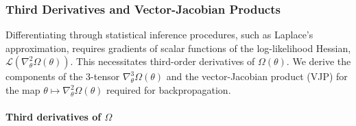 \documentclass{article}
\begin{document}
\subsubsection{Third Derivatives and Vector-Jacobian Products}

Differentiating through statistical inference procedures, such as Laplace's approximation, requires gradients of scalar functions of the log-likelihood Hessian, $\mathcal{L}(\nabla_\theta^2 \Omega(\theta))$.
This necessitates third-order derivatives of $\Omega(\theta)$.
We derive the components of the 3-tensor $\nabla_\theta^3 \Omega(\theta)$ and the vector-Jacobian product (VJP) for the map $\theta \mapsto \nabla_\theta^2 \Omega(\theta)$ required for backpropagation.

\paragraph{Third derivatives of $\Omega$}
\end{document}

